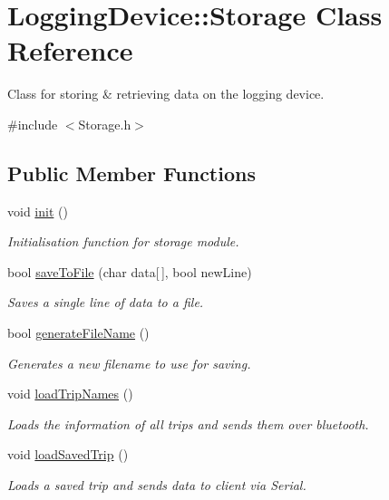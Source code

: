 \hypertarget{class_logging_device_1_1_storage}{}\section{Logging\+Device\+:\+:Storage Class Reference}
\label{class_logging_device_1_1_storage}


Class for storing \& retrieving data on the logging device.  




{\ttfamily \#include $<$Storage.\+h$>$}

\subsection*{Public Member Functions}
\begin{DoxyCompactItemize}
\item 
void \hyperlink{class_logging_device_1_1_storage_a98b01eb20a64a4bf4127685147f7f6f1}{init} ()
\begin{DoxyCompactList}\small\item\em Initialisation function for storage module. \end{DoxyCompactList}\item 
bool \hyperlink{class_logging_device_1_1_storage_a044a17325b2917afca49aa19ddb488f6}{save\+To\+File} (char data\mbox{[}$\,$\mbox{]}, bool new\+Line)
\begin{DoxyCompactList}\small\item\em Saves a single line of data to a file. \end{DoxyCompactList}\item 
bool \hyperlink{class_logging_device_1_1_storage_a571ce9630665d9407ffbaeff55c47b0a}{generate\+File\+Name} ()
\begin{DoxyCompactList}\small\item\em Generates a new filename to use for saving. \end{DoxyCompactList}\item 
void \hyperlink{class_logging_device_1_1_storage_a4831b2e8ecfa22da6971f5a8690cc4e3}{load\+Trip\+Names} ()
\begin{DoxyCompactList}\small\item\em Loads the information of all trips and sends them over bluetooth. \end{DoxyCompactList}\item 
void \hyperlink{class_logging_device_1_1_storage_af56ca8289ed925300e3385114c561eec}{load\+Saved\+Trip} ()
\begin{DoxyCompactList}\small\item\em Loads a saved trip and sends data to client via Serial. \end{DoxyCompactList}\end{DoxyCompactItemize}
